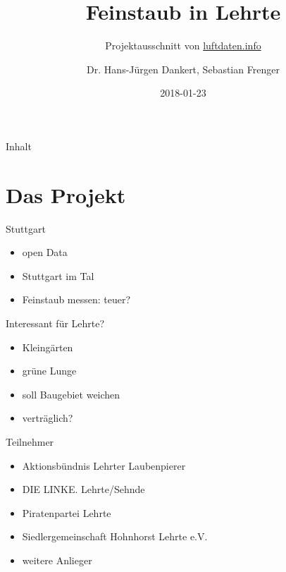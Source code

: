 \documentclass[aspectratio=169]{beamer} %
\begin{document}
\title{Feinstaub in Lehrte}
\subtitle{Projektausschnitt von \href{http://www.luftdaten.info}{luftdaten.info}}
\author{Dr. Hans-Jürgen Dankert, Sebastian Frenger}
\date{2018-01-23} 

\frame{\titlepage} 

\begin{frame}{Inhalt}
  \begin{multicols}{2}
    \tableofcontents
  \end{multicols}
\end{frame}

\section{Das Projekt}  
\begin{frame}{Stuttgart}
  \begin{itemize}
  \item open Data
  \item Stuttgart im Tal
  \item Feinstaub messen: teuer?
  \end{itemize}
\end{frame}

\begin{frame}{Interessant für Lehrte?}
  \begin{itemize}
  \item Kleingärten
  \item grüne Lunge
  \item soll Baugebiet weichen
  \item verträglich?
  \end{itemize}
\end{frame}

\begin{frame}{Teilnehmer}
  \begin{itemize}
  \item Aktionsbündnis Lehrter Laubenpierer
  \item DIE LINKE. Lehrte/Sehnde
  \item Piratenpartei Lehrte
  \item Siedlergemeinschaft Hohnhorst Lehrte e.V.
  \item weitere Anlieger
  \end{itemize}
\end{frame}
\end{document}
